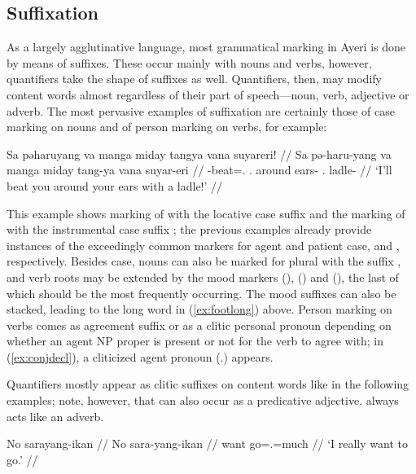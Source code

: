 \subsection{Suffixation}

As a largely agglutinative language, most grammatical marking in Ayeri is done 
by means of suffixes. These occur mainly with nouns and verbs, however, 
quantifiers take the shape of suffixes as well. Quantifiers, then, may modify 
content words almost regardless of their part of speech---noun, verb, adjective 
or adverb. The most pervasive examples of suffixation are certainly those of 
case marking on nouns and of person marking on verbs, for example:

\ex\label{ex:conjdecl}\begingl
	\gla Sa pəharuyang va manga miday tangya vana suyareri! //
	\glb Sa pə-haru-yang va manga miday tang-ya vana suyar-eri //
	\glc \PatT{} \NFut{}-beat=\Fsg{}.\Aarg{} \Ssg{}.\Top{} \Dyn{} around 
		ears-\Loc{} \Ssg{}.\Gen{} ladle-\Ins{} //
	\glft `I'll beat you around your ears with a ladle!' //
\endgl\xe

This example shows marking of  with the locative case 
suffix  and the marking of  with the 
instrumental case suffix ; the previous examples already 
provide instances of the exceedingly common markers for agent and patient 
case,  and , respectively. Besides case, nouns 
can also be marked for plural with the suffix , and verb roots 
may be extended by the mood markers  (\Irr{}), 
 (\Hab{}) and  (\Neg{}), the last of which should 
be the most frequently occurring. The mood suffixes can also be stacked, leading 
to the long word in (\ref{ex:footlong}) above. Person marking on verbs comes as 
agreement suffix or as a clitic personal pronoun depending on whether an agent 
NP proper is present or not for the verb to agree with; in (\ref{ex:conjdecl}), 
a cliticized agent pronoun  (\TsgM{}.\Aarg{}) appears.

Quantifiers mostly appear as clitic suffixes on content words like in the 
following examples; note, however, that  
can also occur as a predicative adjective.  
always acts like an adverb.

\pex
\a\begingl
	\gla No sarayang-ikan //
	\glb No sara-yang-ikan //
	\glc want go=\Fsg{}.\Aarg{}=much //
	\glft `I really want to go.' //
\endgl

